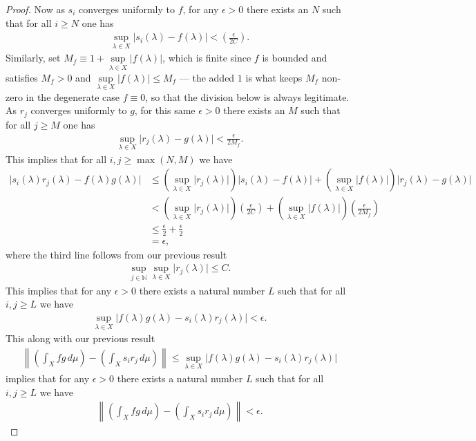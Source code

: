 \begin{proof}
Now as $s_i$ converges uniformly to $f$, for any $\epsilon > 0$ there exists an $N$ such that for all $i \ge N$ one has
\begin{align}
    \sup\limits_{\lambda \in X} \lvert s_i(\lambda) - f(\lambda) \rvert < \left( \frac{\epsilon}{2 C} \right).
\end{align}
Similarly, set $M_f \equiv 1 + \sup\limits_{\lambda \in X} \lvert f(\lambda) \rvert$, which is finite since $f$ is bounded and satisfies $M_f > 0$ and $\sup\limits_{\lambda \in X} \lvert f(\lambda) \rvert \le M_f$ — the added $1$ is what keeps $M_f$ non-zero in the degenerate case $f \equiv 0$, so that the division below is always legitimate. As $r_j$ converges uniformly to $g$, for this same $\epsilon > 0$ there exists an $M$ such that for all $j \ge M$ one has
\begin{align}
    \sup\limits_{\lambda \in X} \lvert r_j(\lambda) - g(\lambda) \rvert < \frac{\epsilon}{2 M_f}.
\end{align}
This implies that for all $i,j \ge \max(N,M)$ we have
\begin{align}
    \lvert s_i(\lambda)r_j(\lambda) - f(\lambda)g(\lambda) \rvert
    &\le \left( \sup\limits_{\lambda \in X} \lvert r_j(\lambda) \rvert \right) \lvert s_i(\lambda) - f(\lambda) \rvert + \left( \sup\limits_{\lambda \in X} \lvert f(\lambda) \rvert \right) \lvert r_j(\lambda) - g(\lambda) \rvert \\
    &<   \left( \sup\limits_{\lambda \in X} \lvert r_j(\lambda) \rvert \right) \left( \frac{\epsilon}{2 C} \right) + \left( \sup\limits_{\lambda \in X} \lvert f(\lambda) \rvert \right) \left( \frac{\epsilon}{2 M_f} \right) \\
    &\le \frac{\epsilon}{2} +  \frac{\epsilon}{2} \\
    &= \epsilon,
\end{align}
where the third line follows from our previous result
\begin{align}
    \sup\limits_{j \in \mathbb{N}} \sup\limits_{\lambda \in X} \lvert r_j(\lambda) \rvert \le C.
\end{align}
This implies that for any $\epsilon > 0$ there exists a natural number $L$ such that for all $i,j \ge L$ we have
\begin{align}
    \sup\limits_{\lambda \in X} \lvert f(\lambda)g(\lambda) - s_i(\lambda)r_j(\lambda) \rvert < \epsilon.
\end{align}
This along with our previous result
\begin{align}
    \left\| \left( \int_X fg \, d\mu \right) - \left( \int_X s_i r_j \, d\mu \right) \right\| \le \sup\limits_{\lambda \in X} \lvert f(\lambda) g(\lambda) - s_i(\lambda) r_j(\lambda) \rvert
\end{align}
implies that for any $\epsilon > 0$ there exists a natural number $L$ such that for all $i,j \ge L$ we have
\begin{align}
    \left\| \left( \int_X fg \, d\mu \right) - \left( \int_X s_i r_j \, d\mu \right) \right\| < \epsilon.
\end{align}
\end{proof}

